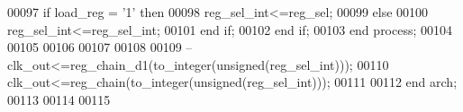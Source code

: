 \begin{DoxyCode}
00097             \textcolor{keywordflow}{if} \textcolor{vhdlchar}{load_reg} \textcolor{vhdlchar}{=} \textcolor{vhdlchar}{'}\textcolor{vhdllogic}{}\textcolor{vhdllogic}{1}\textcolor{vhdlchar}{'} \textcolor{keywordflow}{then} 
00098                 reg\_sel\_int<=reg\_sel;
00099             \textcolor{keywordflow}{else} 
00100                 reg\_sel\_int<=reg\_sel\_int;
00101             \textcolor{keywordflow}{end} \textcolor{keywordflow}{if};
00102         \textcolor{keywordflow}{end} \textcolor{keywordflow}{if};
00103     \textcolor{keywordflow}{end} \textcolor{keywordflow}{process}; 
00104      
00105      
00106      
00107 
00108 
00109 \textcolor{keyword}{--clk\_out<=reg\_chain\_d1(to\_integer(unsigned(reg\_sel\_int)));}
00110 \textcolor{vhdlchar}{clk_out}\textcolor{vhdlchar}{<=}\textcolor{vhdlchar}{reg_chain}\textcolor{vhdlchar}{(}\textcolor{vhdlchar}{to\_integer}\textcolor{vhdlchar}{(}\textcolor{comment}{unsigned}\textcolor{vhdlchar}{(}\textcolor{vhdlchar}{reg_sel_int}\textcolor{vhdlchar}{)}\textcolor{vhdlchar}{)}\textcolor{vhdlchar}{)};
00111   
00112 \textcolor{keywordflow}{end} \textcolor{vhdlchar}{arch};   
00113 
00114 
00115 
\end{DoxyCode}
